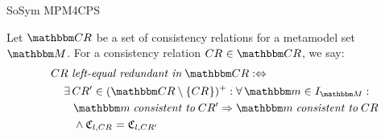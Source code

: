 \begin{copiedFrom}{SoSym MPM4CPS}
\begin{definition} \label{def:leftequalredundancy}
    Let $\consistencyrelationset{CR}$ be a set of consistency relations for a metamodel set $\metamodelset{M}$.
    For a consistency relation $\consistencyrelation{CR}{} \in \consistencyrelationset{CR}$, we say:
    \begin{align*}
        \formulaskip &
        \consistencyrelation{CR}{} \leftequalredundantinmath \consistencyrelationset{CR} \equivalentperdefinition \\
        & \formulaskip 
        \exists \consistencyrelation{CR'}{} \in \transitiveclosure{(\consistencyrelationset{CR} \setminus \setted{\consistencyrelation{CR}{}})} : 
        \forall \modelset{m} \in \metamodelinstances{\metamodelset{M}} :\\
        & \formulaskip\formulaskip
        \modelset{m} \consistenttomath \consistencyrelation{CR'}{} \Rightarrow \modelset{m} \consistenttomath \consistencyrelation{CR}{} \\
        & \formulaskip\formulaskip
        \land \classtuple{C}{l,\consistencyrelation{CR}{}} = \classtuple{C}{l,\consistencyrelation{CR'}{}}
    \end{align*}
\end{definition}



\end{copiedFrom}
